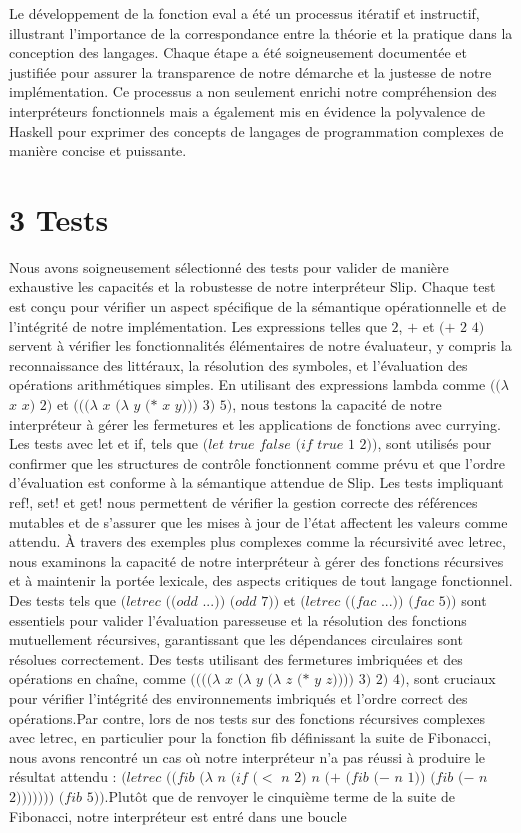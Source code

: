 \documentclass[10pt]{article}
\begin{document}
Le développement de la fonction eval a été un processus itératif et instructif, illustrant l'importance de la correspondance entre la théorie et la pratique dans la conception des langages. Chaque étape a été soigneusement documentée et justifiée pour assurer la transparence de notre démarche et la justesse de notre implémentation. Ce processus a non seulement enrichi notre compréhension des interpréteurs fonctionnels mais a également mis en évidence la polyvalence de Haskell pour exprimer des concepts de langages de programmation complexes de manière concise et puissante.

\section*{3 Tests}

Nous avons soigneusement sélectionné des tests pour valider de manière exhaustive les capacités et la robustesse de notre interpréteur Slip. Chaque test est conçu pour vérifier un aspect spécifique de la sémantique opérationnelle et de l'intégrité de notre implémentation. Les expressions telles que $2$, $+$ et $(+$ $2$ $4)$ servent à vérifier les fonctionnalités élémentaires de notre évaluateur, y compris la reconnaissance des littéraux, la résolution des symboles, et l'évaluation des opérations arithmétiques simples. En utilisant des expressions lambda comme $((\lambda$  $x$  $x)$ $2)$ et $(((\lambda$ $x$ $(\lambda$ $y$ $(*$ $x$ $y)))$ $3)$ $5)$, nous testons la capacité de notre interpréteur à gérer les fermetures et les applications de fonctions avec currying. Les tests avec let et if, tels que $(let$ $true$ $false$ $(if$ $true$ $1$ $2))$, sont utilisés pour confirmer que les structures de contrôle fonctionnent comme prévu et que l'ordre d'évaluation est conforme à la sémantique attendue de Slip. Les tests impliquant ref!, set! et get! nous permettent de vérifier la gestion correcte des références mutables et de s'assurer que les mises à jour de l'état affectent les valeurs comme attendu. À travers des exemples plus complexes comme la récursivité avec letrec, nous examinons la capacité de notre interpréteur à gérer des fonctions récursives et à maintenir la portée lexicale, des aspects critiques de tout langage fonctionnel. Des tests tels que $(letrec$ $((odd$ $...))$ $(odd$ $7))$ et $(letrec$ $((fac$ $...))$ $(fac$ $5))$ sont essentiels pour valider l'évaluation paresseuse et la résolution des fonctions mutuellement récursives, garantissant que les dépendances circulaires sont résolues correctement. Des tests utilisant des fermetures imbriquées et des opérations en chaîne, comme $((((\lambda$ $x$ $(\lambda$ $y$ $(\lambda$ $z$ $(*$ $y$ $z))))$ $3)$ $2)$ $4)$, sont cruciaux pour vérifier l'intégrité des environnements imbriqués et l'ordre correct des opérations.Par contre, lors de nos tests sur des fonctions récursives complexes avec letrec, en particulier pour la fonction fib définissant la suite de Fibonacci, nous avons rencontré un cas où notre interpréteur n'a pas réussi à produire le résultat attendu : $(letrec$ $((fib$ $(\lambda$ $n$ $(if$ $(<$ $n$ $2)$ $n$ $(+$ $(fib$ $(-$ $n$ $1))$ $(fib$ $(-$ $n$ $2)))))))$ $(fib$ $5))$.Plutôt que de renvoyer le cinquième terme de la suite de Fibonacci, notre interpréteur est entré dans une boucle 
\end{document}
